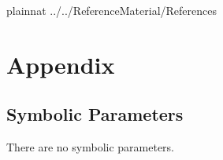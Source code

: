 \documentclass[12pt]{article}
\begin{document}
\clearpage
 {plainnat}
 {../../ReferenceMaterial/References} 

	
	
	
	
	
	

\newpage

\section{Appendix}

\subsection{Symbolic Parameters}

There are no symbolic parameters.  
\end{document}
